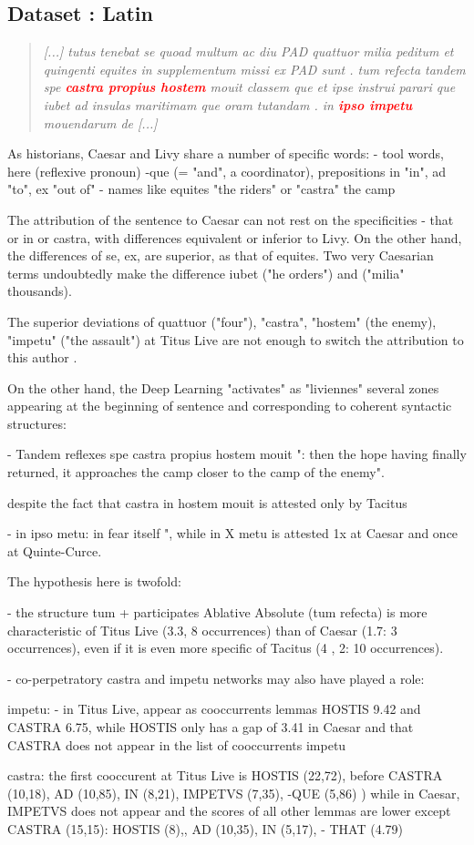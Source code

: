 \subsection{Dataset : Latin}

\begin{quote}
\textit{[...] tutus tenebat se quoad multum ac diu PAD quattuor milia peditum et quingenti equites in supplementum missi ex PAD sunt . tum refecta tandem spe \textcolor{red}{\textbf{castra propius hostem}} mouit classem que et ipse instrui parari que iubet ad insulas maritimam que oram tutandam . in \textcolor{red}{\textbf{ipso impetu}} mouendarum de [...]} 
\end{quote}

As historians, Caesar and Livy share a number of specific words:
- tool words, here (reflexive pronoun) -que (= "and", a coordinator), prepositions in "in", ad "to", ex "out of"
- names like equites "the riders" or "castra" the camp

The attribution of the sentence to Caesar can not rest on the specificities - that or in or castra, with differences equivalent or inferior to Livy. On the other hand, the differences of se, ex, are superior, as that of equites. Two very Caesarian terms undoubtedly make the difference iubet ("he orders") and ("milia" thousands).

The superior deviations of quattuor ("four"), "castra", "hostem" (the enemy), "impetu" ("the assault") at Titus Live are not enough to switch the attribution to this author .

On the other hand, the Deep Learning "activates" as "liviennes" several zones appearing at the beginning of sentence and corresponding to coherent syntactic structures:

- Tandem reflexes spe castra propius hostem mouit ": then the hope having finally returned, it approaches the camp closer to the camp of the enemy".

despite the fact that castra in hostem mouit is attested only by Tacitus

- in ipso metu: in fear itself ", while in X metu is attested 1x at Caesar and once at Quinte-Curce.

The hypothesis here is twofold:

- the structure tum + participates Ablative Absolute (tum refecta) is more characteristic of Titus Live (3.3, 8 occurrences) than of Caesar (1.7: 3 occurrences), even if it is even more specific of Tacitus (4 , 2: 10 occurrences).

- co-perpetratory castra and impetu networks may also have played a role:

impetu:
- in Titus Live, appear as cooccurrents lemmas HOSTIS 9.42 and CASTRA 6.75, while HOSTIS only has a gap of 3.41 in Caesar and that CASTRA does not appear in the list of cooccurrents impetu

castra:
the first cooccurent at Titus Live is HOSTIS (22,72), before CASTRA (10,18), AD (10,85), IN (8,21), IMPETVS (7,35), -QUE (5,86) )
while in Caesar, IMPETVS does not appear and the scores of all other lemmas are lower except CASTRA (15,15): HOSTIS (8),, AD (10,35), IN (5,17), - THAT (4.79)

